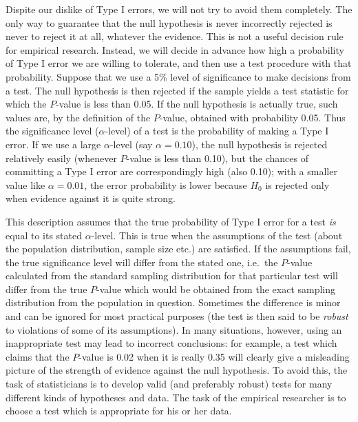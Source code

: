 Dispite our dislike of Type I errors, we will not try to avoid them
completely. The only way to guarantee that the null hypothesis is never
incorrectly rejected is never to reject it at all, whatever the
evidence. This is not a useful decision rule for empirical research.
Instead, we will decide in advance how high a probability of Type I
error we are willing to tolerate, and then use a test procedure with
that probability. Suppose that we use a 5\% level of significance to
make decisions from a test. The null hypothesis is then rejected if the
sample yields a test statistic for which the $P$-value is less than
0.05. If the null hypothesis is actually true, such values are, by the
definition of the $P$-value, obtained with probability 0.05. Thus the
significance level ($\alpha$-level) of a test is the probability of
making a Type I error. If we use a large $\alpha$-level (say
$\alpha=0.10$), the null hypothesis is rejected relatively easily
(whenever $P$-value is less than 0.10), but the chances of
committing a Type I
error are correspondingly high (also 0.10); with a smaller value like
$\alpha=0.01$, the error probability is lower because $H_{0}$ is
rejected only when evidence against it is quite strong.

This description assumes that the true probability of Type I error for a
test \emph{is} equal to its stated $\alpha$-level. This is true when the
assumptions of the test (about the population distribution, sample size
etc.) are satisfied. If the assumptions fail, the true significance
level will differ from the stated one, i.e.\ the $P$-value calculated
from the standard sampling distribution for that particular test will
differ from the true $P$-value which would be obtained from the exact
sampling distribution from the population in question. Sometimes the
difference is minor and can be ignored for most practical purposes (the
test is then said to be \emph{robust} to violations of some of its
assumptions). In many situations, however, using an inappropriate test
may lead to incorrect conclusions: for example, a test which claims that
the $P$-value is 0.02 when it is really 0.35  will clearly give a
misleading picture of the strength of evidence against the null
hypothesis. To avoid this, the task of statisticians is to develop valid
(and preferably robust) tests for many different kinds of hypotheses and
data. The task of the empirical researcher is to choose a test which is appropriate
for his or her data.

